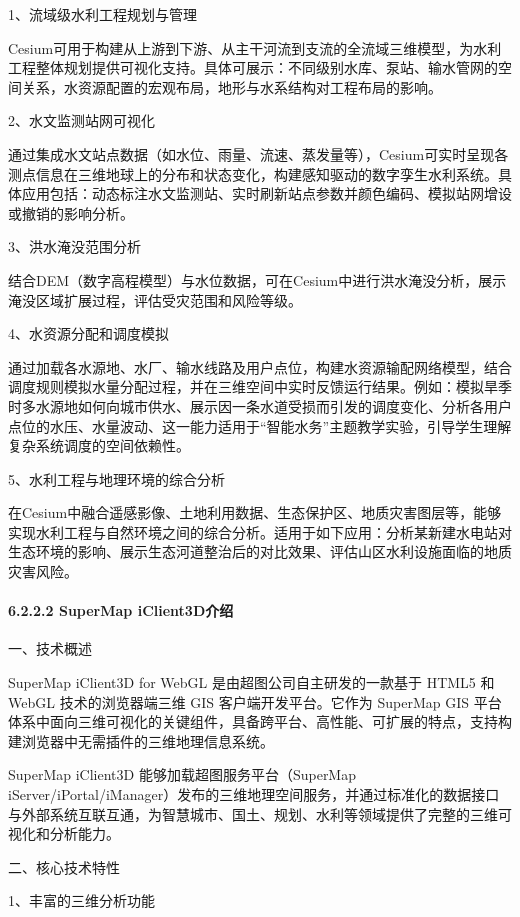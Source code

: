 1、流域级水利工程规划与管理

Cesium可用于构建从上游到下游、从主干河流到支流的全流域三维模型，为水利工程整体规划提供可视化支持。具体可展示：不同级别水库、泵站、输水管网的空间关系，水资源配置的宏观布局，地形与水系结构对工程布局的影响。

2、水文监测站网可视化

通过集成水文站点数据（如水位、雨量、流速、蒸发量等），Cesium可实时呈现各测点信息在三维地球上的分布和状态变化，构建感知驱动的数字孪生水利系统。具体应用包括：动态标注水文监测站、实时刷新站点参数并颜色编码、模拟站网增设或撤销的影响分析。

3、洪水淹没范围分析

结合DEM（数字高程模型）与水位数据，可在Cesium中进行洪水淹没分析，展示淹没区域扩展过程，评估受灾范围和风险等级。

4、水资源分配和调度模拟

通过加载各水源地、水厂、输水线路及用户点位，构建水资源输配网络模型，结合调度规则模拟水量分配过程，并在三维空间中实时反馈运行结果。例如：模拟旱季时多水源地如何向城市供水、展示因一条水道受损而引发的调度变化、分析各用户点位的水压、水量波动、这一能力适用于``智能水务''主题教学实验，引导学生理解复杂系统调度的空间依赖性。

5、水利工程与地理环境的综合分析

在Cesium中融合遥感影像、土地利用数据、生态保护区、地质灾害图层等，能够实现水利工程与自然环境之间的综合分析。适用于如下应用：分析某新建水电站对生态环境的影响、展示生态河道整治后的对比效果、评估山区水利设施面临的地质灾害风险。

\paragraph{6.2.2.2 SuperMap iClient3D介绍}\label{supermap-iclient3dux4ecbux7ecd}

一、技术概述

SuperMap iClient3D for WebGL 是由超图公司自主研发的一款基于 HTML5 和 WebGL 技术的浏览器端三维 GIS 客户端开发平台。它作为 SuperMap GIS 平台体系中面向三维可视化的关键组件，具备跨平台、高性能、可扩展的特点，支持构建浏览器中无需插件的三维地理信息系统。

SuperMap iClient3D 能够加载超图服务平台（SuperMap iServer/iPortal/iManager）发布的三维地理空间服务，并通过标准化的数据接口与外部系统互联互通，为智慧城市、国土、规划、水利等领域提供了完整的三维可视化和分析能力。

二、核心技术特性

1、丰富的三维分析功能

